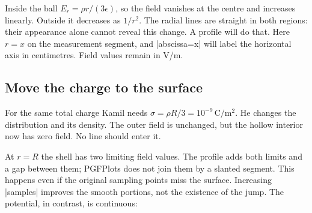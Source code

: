 Inside the ball $E_r=\rho r/(3\epsilon)$, so the field vanishes at the centre
and increases linearly. Outside it decreases as $1/r^2$. The radial lines are
straight in both regions: their appearance alone cannot reveal this change.
A profile will do that. Here $r=x$ on the measurement segment, and |abscissa=x|
will label the horizontal axis in centimetres. Field values remain in V/m.

\subsection{Move the charge to the surface}
For the same total charge Kamil needs $\sigma=\rho R/3=10^{-9}\,\mathrm{C/m^2}$.
He changes the distribution and its density. The outer field is unchanged,
but the hollow interior now has zero field. No line should enter it.

\begin{codeexample}[width=0pt]
\end{codeexample}

\begin{codeexample}[width=0pt]
\end{codeexample}

At $r=R$ the shell has two limiting field values. The profile adds both limits
and a gap between them; PGFPlots does not join them by a slanted segment. This
happens even if the original sampling points miss the surface. Increasing
|samples| improves the smooth portions, not the existence of the jump.
The potential, in contrast, is continuous:

